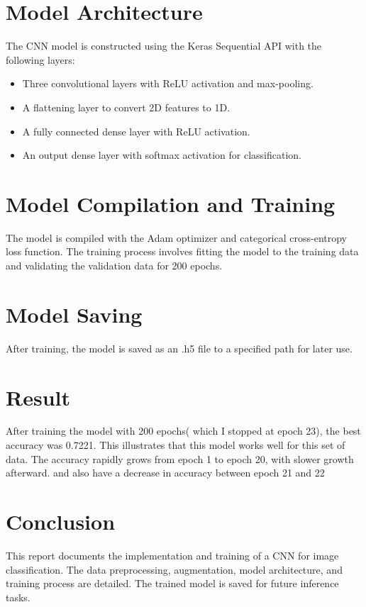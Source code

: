 \documentclass{article}
\begin{document}
\section{Model Architecture}
The CNN model is constructed using the Keras Sequential API with the following layers:
\begin{itemize}
    \item Three convolutional layers with ReLU activation and max-pooling.
    \item A flattening layer to convert 2D features to 1D.
    \item A fully connected dense layer with ReLU activation.
    \item An output dense layer with softmax activation for classification.
\end{itemize}

\section{Model Compilation and Training}
The model is compiled with the Adam optimizer and categorical cross-entropy loss function. The training process involves fitting the model to the training data and validating the validation data for 200 epochs.


\section{Model Saving}
After training, the model is saved as an .h5 file to a specified path for later use.

\section{Result}

After training the model with 200 epochs( which I stopped at epoch 23), the best accuracy was 0.7221. This illustrates that this model works well for this set of data. The accuracy rapidly grows from epoch 1 to epoch 20, with slower growth afterward. and also have a decrease in accuracy between epoch 21 and 22

\section{Conclusion}
This report documents the implementation and training of a CNN for image classification. The data preprocessing, augmentation, model architecture, and training process are detailed. The trained model is saved for future inference tasks.
\end{document}
